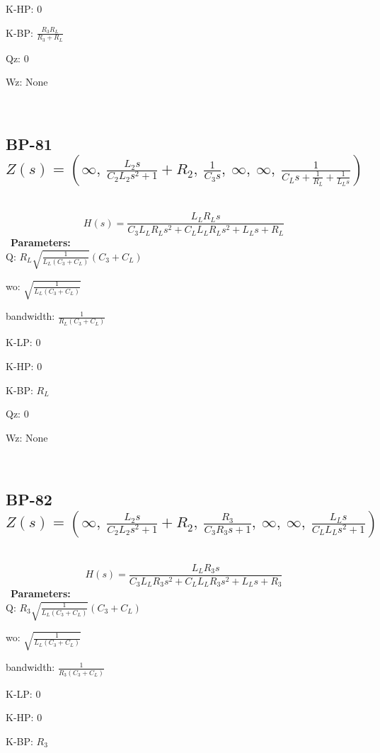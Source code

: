 \documentclass{article}
\begin{document}
K-HP: $0$\ 

K-BP: $\frac{R_{3} R_{L}}{R_{3} + R_{L}}$\ 

Qz: $0$\ 

Wz: $\text{None}$\ 

\ 

\subsection{BP-81 $Z(s) = \left( \infty, \  \frac{L_{2} s}{C_{2} L_{2} s^{2} + 1} + R_{2}, \  \frac{1}{C_{3} s}, \  \infty, \  \infty, \  \frac{1}{C_{L} s + \frac{1}{R_{L}} + \frac{1}{L_{L} s}}\right)$ } \ 
\textbf{\[H(s) = \frac{L_{L} R_{L} s}{C_{3} L_{L} R_{L} s^{2} + C_{L} L_{L} R_{L} s^{2} + L_{L} s + R_{L}}\] } \ 
\textbf{Parameters:}\\ 

Q: $R_{L} \sqrt{\frac{1}{L_{L} \left(C_{3} + C_{L}\right)}} \left(C_{3} + C_{L}\right)$\ 

wo: $\sqrt{\frac{1}{L_{L} \left(C_{3} + C_{L}\right)}}$\ 

bandwidth: $\frac{1}{R_{L} \left(C_{3} + C_{L}\right)}$\ 

K-LP: $0$\ 

K-HP: $0$\ 

K-BP: $R_{L}$\ 

Qz: $0$\ 

Wz: $\text{None}$\ 

\ 

\subsection{BP-82 $Z(s) = \left( \infty, \  \frac{L_{2} s}{C_{2} L_{2} s^{2} + 1} + R_{2}, \  \frac{R_{3}}{C_{3} R_{3} s + 1}, \  \infty, \  \infty, \  \frac{L_{L} s}{C_{L} L_{L} s^{2} + 1}\right)$ } \ 
\textbf{\[H(s) = \frac{L_{L} R_{3} s}{C_{3} L_{L} R_{3} s^{2} + C_{L} L_{L} R_{3} s^{2} + L_{L} s + R_{3}}\] } \ 
\textbf{Parameters:}\\ 

Q: $R_{3} \sqrt{\frac{1}{L_{L} \left(C_{3} + C_{L}\right)}} \left(C_{3} + C_{L}\right)$\ 

wo: $\sqrt{\frac{1}{L_{L} \left(C_{3} + C_{L}\right)}}$\ 

bandwidth: $\frac{1}{R_{3} \left(C_{3} + C_{L}\right)}$\ 

K-LP: $0$\ 

K-HP: $0$\ 

K-BP: $R_{3}$\ 
\end{document}
